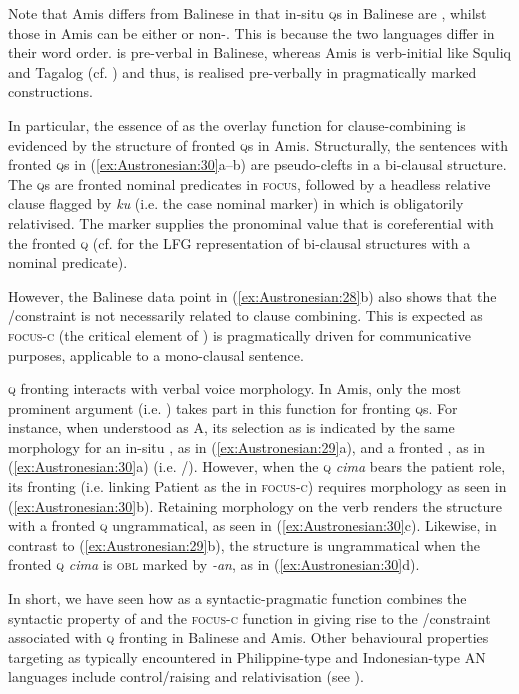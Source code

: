 \documentclass[output=paper,chinesefont]{../langscibook}
\begin{document}
Note that Amis differs from Balinese in that in-situ \textsc{q}s in Balinese are \OBJ, whilst those in Amis can be either \SUBJ or non-\SUBJ. This is because the two languages differ in their word order. \SUBJ is pre-verbal in Balinese, whereas Amis is verb-initial like Squliq and Tagalog (cf. ) and thus, \SUBJ is realised pre-verbally in pragmatically marked constructions.

\hspace*{-.2pt}In particular, the essence of \PIVOT as the overlay function for clause-combining is evidenced by the structure of fronted \textsc{q}s in Amis. Structurally, the sentences with fronted \textsc{q}s in (\ref{ex:Austronesian:30}a--b) are pseudo-clefts in a bi-clausal structure. The \textsc{q}s are fronted nominal predicates in \textsc{focus}, followed by a headless relative clause flagged by \emph{ku} (i.e. the \ABS case nominal marker) in which \SUBJ is obligatorily relativised. The \SUBJ marker supplies the pronominal value that is coreferential with the fronted \textsc{q} (cf.  for the LFG representation of bi-clausal structures with a nominal predicate).

However, the Balinese data point in (\ref{ex:Austronesian:28}b) also shows that the \SUBJ/\PIVOT constraint is not necessarily related to clause combining. This is expected as \textsc{focus-c} (the critical element of \PIVOT) is pragmatically driven for communicative purposes, applicable to a mono-clausal sentence.

\textsc{q} fronting interacts with verbal voice morphology. In Amis, only the most prominent argument (i.e. \SUBJ) takes part in this \PIVOT function for fronting \textsc{q}s. For instance, when understood as A, its selection as \SUBJ is indicated by the same \AV morphology for an in-situ \SUBJ, as in (\ref{ex:Austronesian:29}a), and a fronted \SUBJ, as in (\ref{ex:Austronesian:30}a) (i.e. \SUBJ/\PIVOT). However, when the \textsc{q} \emph{cima} bears the patient role, its fronting (i.e. linking Patient as the \SUBJ in \textsc{focus-c}) requires \PV morphology as seen in (\ref{ex:Austronesian:30}b). Retaining \AV morphology on the verb renders the structure with a fronted \textsc{q} ungrammatical, as seen in (\ref{ex:Austronesian:30}c). Likewise, in contrast to (\ref{ex:Austronesian:29}b), the structure is ungrammatical when the fronted \textsc{q} \emph{cima} is \textsc{obl} marked by \emph{-an}, as in (\ref{ex:Austronesian:30}d).

In short, we have seen how \PIVOT as a syntactic-pragmatic function combines the syntactic property of \SUBJ and the \textsc{focus-c} function in giving rise to the \SUBJ/\PIVOT constraint associated with \textsc{q} fronting in Balinese and Amis. Other behavioural properties targeting \SUBJ as \PIVOT typically encountered in Philippine-type and Indonesian-type AN languages include control/raising and relativisation (see \citealt[11-26]{arka2003}).
\end{document}
